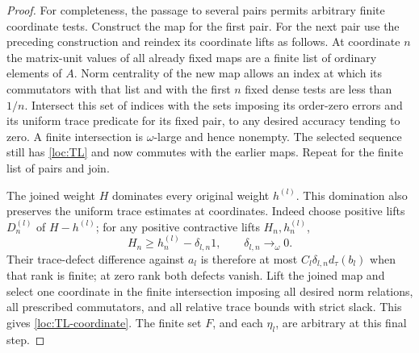 \begin{proof}
For completeness, the passage to several pairs permits arbitrary
finite coordinate tests.  Construct the map for the first pair.
For the next pair use the preceding construction and reindex its
coordinate lifts as follows.  At coordinate $n$ the matrix-unit
values of all already fixed maps are a finite list of ordinary
elements of $A$.  Norm centrality of the new map allows an index at
which its commutators with that list and with the first $n$ fixed
dense tests are less than $1/n$.  Intersect this set of indices with
the sets imposing its order-zero errors and its uniform trace
predicate for its fixed pair, to any desired accuracy tending to
zero.  A finite intersection is $\omega$-large and hence nonempty.
The selected sequence still has \eqref{loc:TL} and now commutes with
the earlier maps.  Repeat for the finite list of pairs and join.

The joined weight $H$ dominates every original weight $h^{(l)}$.
This domination also preserves the uniform trace estimates at
coordinates.  Indeed choose positive lifts $D^{(l)}_n$ of
$H-h^{(l)}$; for any positive contractive lifts $H_n,h^{(l)}_n$,
\[
 H_n\ge h^{(l)}_n-\delta_{l,n}1,
 \qquad \delta_{l,n}\to_\omega0.
\]
Their trace-defect difference against $a_l$ is therefore at most
$C_l\delta_{l,n}d_\tau(b_l)$ when that rank is finite; at zero rank
both defects vanish.  Lift the joined \cpc map and select one
coordinate in the finite intersection imposing all desired norm
relations, all prescribed commutators, and all relative trace
bounds with strict slack.  This gives
\eqref{loc:TL-coordinate}.  The finite set $F$, and each $\eta_l$,
are arbitrary at this final step.
\end{proof}
